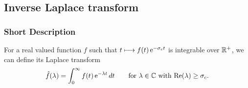 

\subsection{Inverse Laplace transform}
\subsubsection{Short Description}

For a real valued function $f$ such that $t \longmapsto f(t) \operatorname{e}^{ - \sigma_c
  t }$ is integrable over ${\mathbb R}^+$, we can define its Laplace transform
\begin{equation*}
  \hat{f}(\lambda) = \int_0^\infty f(t) \operatorname{e}^{ - \lambda t } dt \qquad
  \mbox{for $\lambda \in {\mathbb C}$ with $\operatorname{Re}(\lambda) \ge \sigma_c$}.
\end{equation*}

